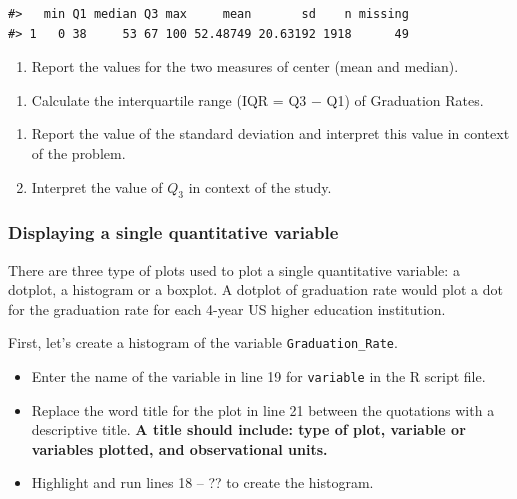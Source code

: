 \documentclass[
]{report}
\providecommand{\tightlist}{%
  \setlength{\itemsep}{0pt}\setlength{\parskip}{0pt}}
\begin{document}
\begin{verbatim}
#>   min Q1 median Q3 max     mean       sd    n missing
#> 1   0 38     53 67 100 52.48749 20.63192 1918      49
\end{verbatim}

\begin{enumerate}
\def\labelenumi{\arabic{enumi}.}
\setcounter{enumi}{1}
\tightlist
\item
  Report the values for the two measures of center (mean and median).
\end{enumerate}

\vspace{0.5in}

\begin{enumerate}
\def\labelenumi{\arabic{enumi}.}
\setcounter{enumi}{2}
\tightlist
\item
  Calculate the interquartile range (IQR = Q3 \(-\) Q1) of Graduation Rates.
\end{enumerate}

\vspace{0.5in}

\begin{enumerate}
\def\labelenumi{\arabic{enumi}.}
\setcounter{enumi}{3}
\item
  Report the value of the standard deviation and interpret this value in context of the problem.
  \vspace{0.8in}
\item
  Interpret the value of \(Q_3\) in context of the study.
\end{enumerate}

\vspace{0.8in}

\subsubsection*{Displaying a single quantitative variable}\label{displaying-a-single-quantitative-variable}

There are three type of plots used to plot a single quantitative variable: a dotplot, a histogram or a boxplot. A dotplot of graduation rate would plot a dot for the graduation rate for each 4-year US higher education institution.

First, let's create a histogram of the variable \texttt{Graduation\_Rate}.

\begin{itemize}
\item
  Enter the name of the variable in line 19 for \texttt{variable} in the R script file.
\item
  Replace the word title for the plot in line 21 between the quotations with a descriptive title. \textbf{A title should include: type of plot, variable or variables plotted, and observational units.}
\item
  Highlight and run lines 18 -- ?? to create the histogram.
\end{itemize}
\end{document}
